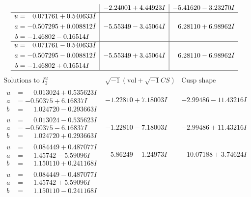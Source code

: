 \documentclass[1p]{elsarticle_modified}
\theoremstyle{definition}
\newcommand{\I}{\sqrt{-1}}
\begin{document}
$$\begin{array}{c|c|c}
 & -2.24001 + 4.44923 I & -5.41620 - 3.23270 I \\ \hline\begin{aligned}
u &= \phantom{-}0.071761 + 0.540633 I \\
a &= -0.507295 + 0.008812 I \\
b &= -1.46802 - 0.16514 I\end{aligned}
 & -5.55349 - 3.45064 I & \phantom{-}6.28110 + 6.98962 I \\ \hline\begin{aligned}
u &= \phantom{-}0.071761 - 0.540633 I \\
a &= -0.507295 - 0.008812 I \\
b &= -1.46802 + 0.16514 I\end{aligned}
 & -5.55349 + 3.45064 I & \phantom{-}6.28110 - 6.98962 I\\
 \hline 
 \end{array}$$\newpage$$\begin{array}{c|c|c}  
\text{Solutions to }I^u_{2}& \I (\text{vol} + \sqrt{-1}CS) & \text{Cusp shape}\\
 \hline 
\begin{aligned}
u &= \phantom{-}0.013024 + 0.535623 I \\
a &= -0.50375 + 6.16837 I \\
b &= \phantom{-}1.024720 - 0.293663 I\end{aligned}
 & -1.22810 + 7.18003 I & -2.99486 - 11.43216 I \\ \hline\begin{aligned}
u &= \phantom{-}0.013024 - 0.535623 I \\
a &= -0.50375 - 6.16837 I \\
b &= \phantom{-}1.024720 + 0.293663 I\end{aligned}
 & -1.22810 - 7.18003 I & -2.99486 + 11.43216 I \\ \hline\begin{aligned}
u &= \phantom{-}0.084449 + 0.487077 I \\
a &= \phantom{-}1.45742 - 5.59096 I \\
b &= \phantom{-}1.150110 + 0.241168 I\end{aligned}
 & -5.86249 - 1.24973 I & -10.07188 + 3.74624 I \\ \hline\begin{aligned}
u &= \phantom{-}0.084449 - 0.487077 I \\
a &= \phantom{-}1.45742 + 5.59096 I \\
b &= \phantom{-}1.150110 - 0.241168 I\end{aligned}

\end{array}$$
\end{document}
